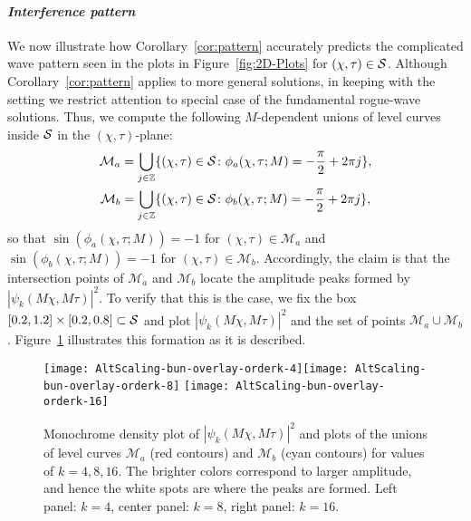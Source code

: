 \paragraph{\textit{Interference pattern}} We now illustrate how Corollary~\ref{cor:pattern} accurately predicts the complicated wave pattern seen in the plots in Figure~\ref{fig:2D-Plots} for $(\chi,\tau)\in\mathcal{S}$.  
Although Corollary~\ref{cor:pattern} applies to more general solutions, in keeping with the setting we restrict attention to special case of the fundamental rogue-wave solutions.
Thus, we compute the following $M$-dependent unions of level curves inside $\mathcal{S}$ in the $(\chi,\tau)$-plane:
\begin{align}
\mathcal{M}_a &=\bigcup_{j\in\mathbb{Z}} \{ (\chi,\tau)\in \mathcal{S} \colon \phi_a(\chi,\tau;M) = - \frac{\pi}{2} + 2\pi j \},\\
\mathcal{M}_b &=\bigcup_{j\in\mathbb{Z}} \{ (\chi,\tau)\in \mathcal{S} \colon \phi_b(\chi,\tau;M) = - \frac{\pi}{2} + 2\pi j \},
\end{align}
so that $\sin(\phi_a(\chi,\tau;M)) =  -1$ for $(\chi,\tau)\in \mathcal{M}_a$ and  $\sin(\phi_b(\chi,\tau;M)) =  -1$ for $(\chi,\tau)\in \mathcal{M}_b$. 
Accordingly, the claim is that the intersection points of $\mathcal{M}_a$ and $\mathcal{M}_b$ locate the amplitude peaks formed by $|\psi_k(M \chi, M\tau)|^2$. To verify that this is the case, we fix the box $[0.2, 1.2]\times[0.2,0.8] \subset \mathcal{S}$ and plot $|\psi_k(M \chi, M\tau)|^2$ and the set of points $\mathcal{M}_a \cup \mathcal{M}_b$. Figure~\ref{f:interference-overlays} illustrates this formation as it is described.

\begin{figure}[h]
\texttt{[image: AltScaling-bun-overlay-orderk-4]}\quad \texttt{[image: AltScaling-bun-overlay-orderk-8]}
\texttt{[image: AltScaling-bun-overlay-orderk-16]}
\caption{Monochrome density plot of $|\psi_k(M \chi, M\tau)|^2$ and plots of the unions of level curves $\mathcal{M}_a$ (red contours) and $\mathcal{M}_b$ (cyan contours) for values of $k=4,8,16$. The brighter colors correspond to larger amplitude, and hence the white spots are where the peaks are formed. Left panel: $k=4$, center panel: $k=8$, right panel: $k=16$.}
\label{f:interference-overlays}
\end{figure}

